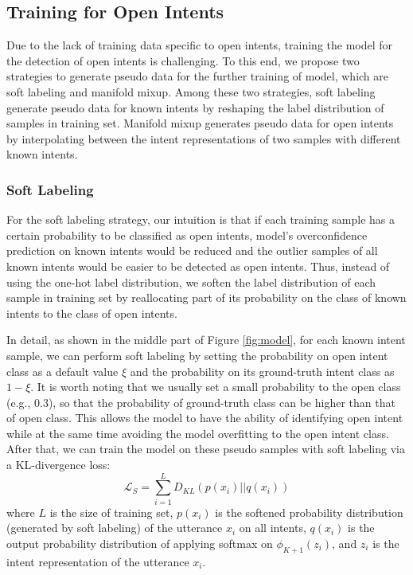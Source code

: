 \documentclass[journal]{IEEEtran}
\begin{document}
\subsection{Training for Open Intents}
Due to the lack of training data specific to open intents, training the model for the detection of open intents is challenging. 
To this end, we propose two strategies to generate pseudo data for the further training of model, which are soft labeling and manifold mixup.
Among these two strategies, soft labeling generate pseudo data for known intents by reshaping the label distribution of samples in training set.
Manifold mixup generates pseudo data for open intents by interpolating between the intent representations of two samples with different known intents. 

\subsubsection{Soft Labeling}

For the soft labeling strategy, our intuition is that if each training sample has a certain probability to be classified as open intents, model's overconfidence prediction on known intents would be reduced and the outlier samples of all known intents would be easier to be detected as open intents.
Thus, instead of using the one-hot label distribution, we soften the label distribution of each sample in training set by reallocating part of its probability on the class of known intents to the class of open intents.

In detail, as shown in the middle part of Figure \ref{fig:model}, for each known intent sample, we can perform soft labeling by setting the probability on open intent class as a default value $\xi$ and the probability on its ground-truth intent class as $1-\xi$.
It is worth noting that we usually set a small probability to the open class (e.g., 0.3), so that the probability of ground-truth class can be higher than that of open class.
This allows the model to have the ability of identifying open intent while at the same time avoiding the model overfitting to the open intent class.
After that, we can train the model on these pseudo samples with soft labeling via a KL-divergence loss:
 \begin{equation}
    \mathcal{L}_S = \sum_{i=1}^{L}D_{KL}\left(p(x_i)||q(x_i)\right)
\end{equation}
where $L$ is the size of training set, $p(x_i)$ is the softened probability distribution (generated by soft labeling) of the utterance $x_i$ on all intents, $q(x_i)$ is the output probability distribution of applying softmax on $\phi_{K+1}(z_i)$, and $z_i$ is the intent representation of the utterance $x_i$.
\end{document}
